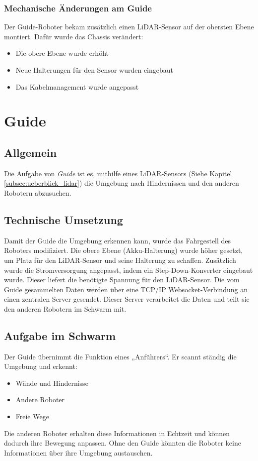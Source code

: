 \subsubsection{Mechanische Änderungen am Guide}
Der Guide-Roboter bekam zusätzlich einen LiDAR-Sensor auf der obersten Ebene montiert.
Dafür wurde das Chassis verändert:
\begin{itemize}
    \item Die obere Ebene wurde erhöht
    \item Neue Halterungen für den Sensor wurden eingebaut
    \item Das Kabelmanagement wurde angepasst
\end{itemize}






\section{Guide}
\label{subsec:hardware_guide}
\subsection{Allgemein}
Die Aufgabe von \textit{Guide} ist es,
mithilfe eines LiDAR-Sensors (Siehe Kapitel \ref{subsec:ueberblick_lidar}) die Umgebung nach Hindernissen
und den anderen Robotern abzusuchen.
%
\subsection{Technische Umsetzung}
Damit der Guide die Umgebung erkennen kann, wurde das Fahrgestell des Roboters modifiziert. Die obere Ebene (Akku-Halterung) wurde höher gesetzt, um Platz für den LiDAR-Sensor und seine Halterung zu schaffen. Zusätzlich wurde die Stromversorgung angepasst, indem ein Step-Down-Konverter eingebaut wurde. Dieser liefert die benötigte Spannung für den LiDAR-Sensor.
%
Die vom Guide gesammelten Daten werden über eine TCP/IP Websocket-Verbindung an einen zentralen Server gesendet. Dieser Server verarbeitet die Daten und teilt sie den anderen Robotern im Schwarm mit.
%
\subsection{Aufgabe im Schwarm}
Der Guide übernimmt die Funktion eines „Anführers“.
Er scannt ständig die Umgebung und erkennt:
\begin{itemize}
    \item Wände und Hindernisse
    \item Andere Roboter
    \item Freie Wege
\end{itemize}
Die anderen Roboter erhalten diese Informationen in Echtzeit und können dadurch ihre Bewegung anpassen.
Ohne den Guide könnten die Roboter keine Informationen über ihre Umgebung austauschen.
%
